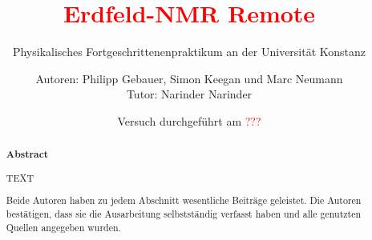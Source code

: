 \title{\textcolor{red}{Erdfeld-NMR Remote}}
\subtitle{Physikalisches Fortgeschrittenenpraktikum an der Universität Konstanz}
\author{Autoren: Philipp Gebauer, Simon Keegan und Marc Neumann \\ \large{Tutor: Narinder Narinder}}
\date{Versuch durchgeführt am \textcolor{red}{???}}
\maketitle
\begin{abstract}
    \begin{center}
        \Large{\textsf{\textbf{Abstract}}}
    \end{center}
    \vspace{0.75 cm}
    \begin{singlespace}
    \noindent TEXT
    \vspace{0.75 cm}
     
    \noindent Beide Autoren haben zu jedem Abschnitt wesentliche Beiträge geleistet. Die Autoren bestätigen, dass sie die Ausarbeitung selbstständig verfasst haben und alle genutzten Quellen angegeben wurden.

\end{singlespace}
\end{abstract}

\thispagestyle{empty}
\newpage